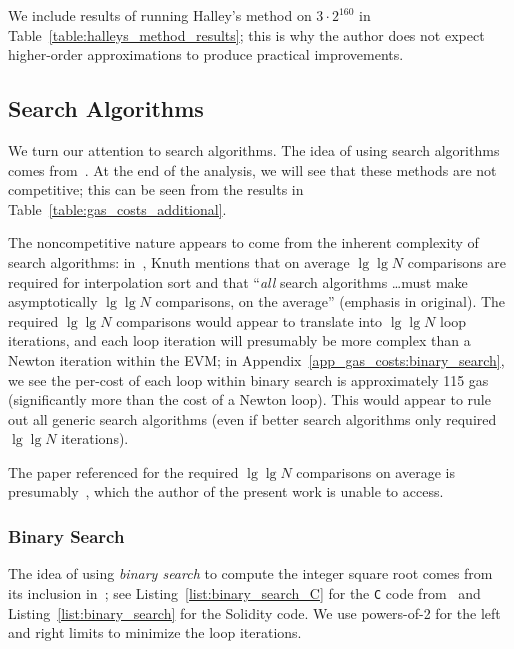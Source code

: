 We include results of running Halley's method on $3\cdot2^{160}$ in
Table~\ref{table:halleys_method_results};
this is why the author
does not expect higher-order approximations
to produce practical improvements.





\subsection{Search Algorithms}
\label{app:algs_opt_search}

We turn our attention to search algorithms.
The idea of using search algorithms comes
from~\cite[Chapter 11-1 Integer Square Root, Binary Search]{HackersDelight}.
At the end of the analysis,
we will see that these methods are not competitive;
this can be seen from the results in Table~\ref{table:gas_costs_additional}.

The noncompetitive nature appears to come from the
inherent complexity of search algorithms:
in~\cite[Page 425, Exercise 6.2.1.22]{taocp3},
Knuth mentions that on average $\lg\lg N$ comparisons are required
for interpolation sort
and that ``\emph{all} search algorithms \dots must make asymptotically
$\lg\lg N$ comparisons, on the average'' (emphasis in original).
The required $\lg\lg N$ comparisons would appear to translate into
$\lg\lg N$ loop iterations,
and each loop iteration will presumably be more complex
than a Newton iteration within the EVM;
in Appendix~\ref{app_gas_costs:binary_search},
we see the per-cost of each loop within binary search is
approximately 115 gas
(significantly more than the cost of a Newton loop).
This would appear to rule out all generic search algorithms
(even if better search algorithms only required $\lg\lg N$ iterations).

The paper referenced for the required $\lg\lg N$ comparisons on average
is presumably~\cite{YaoYaoSearching},
which the author of the present work is unable to access.

\subsubsection{Binary Search}

The idea of using \emph{binary search} to compute
the integer square root comes from its inclusion
in~\cite{HackersDelight};
see Listing~\ref{list:binary_search_C}
for the \texttt{C} code from~\cite{HackersDelightArchive}
and Listing~\ref{list:binary_search}
for the Solidity code.
We use powers-of-2 for the left and right limits
to minimize the loop iterations.

